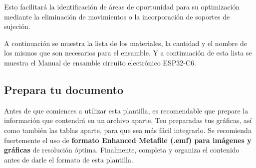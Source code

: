     Esto facilitará la identificación de áreas de oportunidad para su optimización mediante la eliminación de movimientos o la incorporación de soportes de sujeción. 
    
     A continuación se muestra la lista de los materiales, la cantidad y el nombre de los mismos que son necesarios para el ensamble. 
     Y a continuación de esta lista se muestra el Manual de ensamble circuito electrónico ESP32-C6.
    
    
    
    \label{anexo:Lista de materiales.pdf}
    
    
    \label{anexo:Manual de ensable circuito electrónico ESP32-C6.pdf}
    
    \subsection{Prepara tu documento}
    
    Antes de que comiences a utilizar esta plantilla, es recomendable que prepare la información que contendrá en un archivo aparte. 
    Ten preparadas tus gráficas, así como también las tablas aparte, para que sea más fácil integrarlo. 
    Se recomienda fuertemente el uso de \textbf{formato Enhanced Metafile (.emf) para imágenes y gráficas} de resolución óptima. 
    Finalmente, completa y organiza el contenido antes de darle el formato de esta plantilla. 
    

